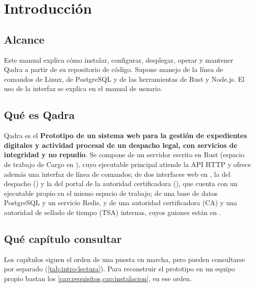 \chapter{Introducción}\label{cap:introduccion}

\section{Alcance}\label{sec:intro-proposito}

Este manual explica cómo instalar, configurar, desplegar, operar y mantener
Qadra a partir de su repositorio de código. Supone manejo de la línea de
comandos de Linux, de PostgreSQL y de las herramientas de Rust y Node.js. El
uso de la interfaz se explica en el manual de usuario.

\section{Qué es Qadra}\label{sec:intro-qadra}

Qadra es el \textbf{Prototipo de un sistema web para la gestión de
expedientes digitales y actividad procesal de un despacho legal, con
servicios de integridad y no repudio}. Se compone de un servidor escrito en Rust
(espacio de trabajo de Cargo en ), cuyo ejecutable
principal atiende la API HTTP y ofrece además una interfaz de línea de
comandos; de dos interfaces web en , la del despacho
() y la del portal de la autoridad certificadora
(), que cuenta con un ejecutable propio en el mismo espacio de
trabajo; de una base de datos PostgreSQL y un servicio Redis, y de una
autoridad certificadora (CA) y una autoridad de sellado de tiempo (TSA)
internas, cuyos guiones están en .


\section{Qué capítulo consultar}\label{sec:intro-lectura}

Los capítulos siguen el orden de una puesta en marcha, pero pueden consultarse
por separado (\cref{tab:intro-lectura}). Para reconstruir
el prototipo en un equipo propio bastan los
\cref{cap:requisitos,cap:instalacion}, en ese orden.

